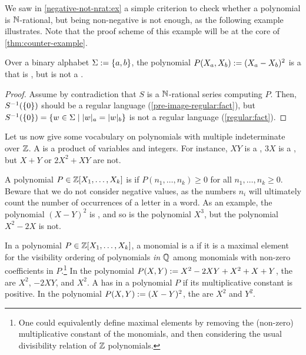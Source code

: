 \documentclass[a4paper,11pt]{article}
\begin{document}
We saw in \cref{negative-not-nrat:ex}
a simple criterion to check whether a polynomial is $\mathbb{N}$-rational,
but being non-negative is not enough, as the following example
illustrates. Note that the proof scheme
of this example will be at the core of \cref{thm:counter-example}.

\begin{example}
    Over a binary alphabet $\Sigma \mathrel{:=} \mathopen{\{} a,b \mathclose{\}}$,
    the polynomial $P(X_a, X_b) \mathrel{:=} (X_a - X_b)^2$
    is a  that is ,
    but is
    not a .
\end{example}
\begin{proof}
    Assume by contradiction that
    $S$ is a $\mathbb{N}$-rational series computing $P$.
    Then, $S^{-1}(\mathopen{\{} 0 \mathclose{\}})$ should be a regular language
    (\cref{pre-image-regular:fact}),
    but $S^{-1}(\set{0}) = \setof{ w \in \Sigma }{ \card[a]{w} = \card[b]{w} }$
    is not a regular language (\cref{regular:fact}).
\end{proof}


\AP Let us now give some vocabulary on polynomials with multiple indeterminate
over $\mathbb{Z}$. A  is a product of variables and integers. For
instance, $XY$ is a , $3 X$ is a , but $X + Y$ or
$2X^2 + XY$ are not.

\AP A polynomial $P \in \mathbb{Z}[X_1, \dots, X_k]$ is  if
$P(n_1, \dots, n_k) \geq 0$ for all $n_1, \dots, n_k \geq 0$. Beware that we do
not consider negative values, as the numbers $n_i$ will ultimately count the
number of occurrences of a letter in a word. As an example, the polynomial $(X
- Y)^2$ is , and so is the polynomial $X^3$, but the
polynomial $X^2 - 2X$ is not.

\AP
In a polynomial $P \in \mathbb{Z}[X_1, \dots, X_k]$, a monomial 
is a  if it is a maximal element
for the visibility ordering of polynomials \emph{in $\mathbb{Q}$}
among monomials with non-zero coefficients in $P$.\footnote{
    One could equivalently define maximal elements by removing the (non-zero)
    multiplicative constant of the monomials, and then
    considering the usual divisibility relation of $\mathbb{Z}$ polynomials.
}
In the polynomial 
$P(X,Y) \mathrel{:=} X^2 - 2XY + X^2 + X + Y$, the 
are $X^2$, $-2 XY$, and $X^2$.
A  has  in a polynomial $P$ if its
multiplicative constant is positive. In the polynomial $P(X,Y) \mathrel{:=} (X -
Y)^2$, the  are $X^2$ and $Y^2$.
\end{document}
